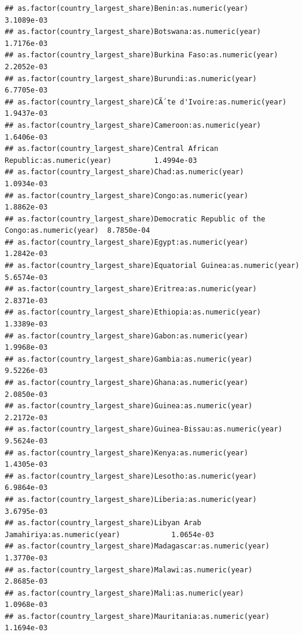 \documentclass[
  a4paper,
]{article}
\begin{document}
\begin{verbatim}
## as.factor(country_largest_share)Benin:as.numeric(year)                             3.1089e-03
## as.factor(country_largest_share)Botswana:as.numeric(year)                          1.7176e-03
## as.factor(country_largest_share)Burkina Faso:as.numeric(year)                      2.2052e-03
## as.factor(country_largest_share)Burundi:as.numeric(year)                           6.7705e-03
## as.factor(country_largest_share)CÃ´te d'Ivoire:as.numeric(year)                    1.9437e-03
## as.factor(country_largest_share)Cameroon:as.numeric(year)                          1.6406e-03
## as.factor(country_largest_share)Central African Republic:as.numeric(year)          1.4994e-03
## as.factor(country_largest_share)Chad:as.numeric(year)                              1.0934e-03
## as.factor(country_largest_share)Congo:as.numeric(year)                             1.8862e-03
## as.factor(country_largest_share)Democratic Republic of the Congo:as.numeric(year)  8.7850e-04
## as.factor(country_largest_share)Egypt:as.numeric(year)                             1.2842e-03
## as.factor(country_largest_share)Equatorial Guinea:as.numeric(year)                 5.6574e-03
## as.factor(country_largest_share)Eritrea:as.numeric(year)                           2.8371e-03
## as.factor(country_largest_share)Ethiopia:as.numeric(year)                          1.3389e-03
## as.factor(country_largest_share)Gabon:as.numeric(year)                             1.9968e-03
## as.factor(country_largest_share)Gambia:as.numeric(year)                            9.5226e-03
## as.factor(country_largest_share)Ghana:as.numeric(year)                             2.0850e-03
## as.factor(country_largest_share)Guinea:as.numeric(year)                            2.2172e-03
## as.factor(country_largest_share)Guinea-Bissau:as.numeric(year)                     9.5624e-03
## as.factor(country_largest_share)Kenya:as.numeric(year)                             1.4305e-03
## as.factor(country_largest_share)Lesotho:as.numeric(year)                           6.9864e-03
## as.factor(country_largest_share)Liberia:as.numeric(year)                           3.6795e-03
## as.factor(country_largest_share)Libyan Arab Jamahiriya:as.numeric(year)            1.0654e-03
## as.factor(country_largest_share)Madagascar:as.numeric(year)                        1.3770e-03
## as.factor(country_largest_share)Malawi:as.numeric(year)                            2.8685e-03
## as.factor(country_largest_share)Mali:as.numeric(year)                              1.0968e-03
## as.factor(country_largest_share)Mauritania:as.numeric(year)                        1.1694e-03

\end{verbatim}
\end{document}
